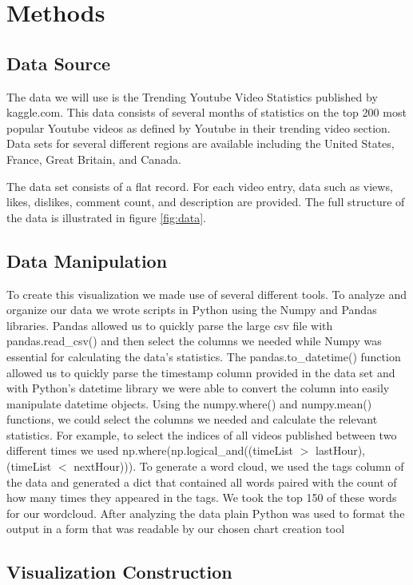 \documentclass[journal]{vgtc}                %
\begin{document}
\section{Methods}

\subsection{Data Source}
The data we will use is the Trending Youtube Video Statistics published by kaggle.com. This data consists of several months of statistics on the top 200 most popular Youtube videos as defined by Youtube in their trending video section. Data sets for several different regions are available including the United States, France, Great Britain, and Canada. 

The data set consists of a flat record. For each video entry, data such as views, likes, dislikes, comment count, and description are provided. The full structure of the data is illustrated in figure \ref{fig:data}.

\subsection{Data Manipulation}
To create this visualization we made use of several different tools. To analyze and organize our data we wrote scripts in Python using the Numpy and Pandas libraries. Pandas allowed us to quickly parse the large csv file with pandas.read\_csv() and then select the columns we needed while Numpy was essential for calculating the data's statistics. The pandas.to\_datetime() function allowed us to quickly parse the timestamp column provided in the data set and with Python's datetime library we were able to convert the column into easily manipulate datetime objects.  Using the numpy.where() and numpy.mean() functions, we could select the columns we needed and calculate the relevant statistics. For example, to select the indices of all videos published between two different times we used np.where(np.logical\_and((timeList $>$ lastHour),  (timeList $<$ nextHour))). To generate a word cloud, we used the tags column of the data and generated a dict that contained all words paired with the count of how many times they appeared in the tags. We took the top 150 of these words for our wordcloud. After analyzing the data plain Python was used to format the output in a form that was readable by our chosen chart creation tool

\subsection{Visualization Construction}
\end{document}
